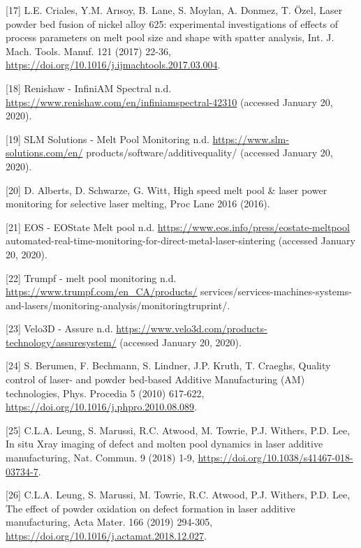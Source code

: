 \documentclass[10pt]{article}
\begin{document}
[17] L.E. Criales, Y.M. Arısoy, B. Lane, S. Moylan, A. Donmez, T. Özel, Laser powder bed fusion of nickel alloy 625: experimental investigations of effects of process parameters on melt pool size and shape with spatter analysis, Int. J. Mach. Tools. Manuf. 121 (2017) 22-36, \href{https://doi.org/10.1016/j.ijmachtools.2017.03.004}{https://doi.org/10.1016/j.ijmachtools.2017.03.004}.

[18] Renishaw - InfiniAM Spectral n.d. \href{https://www.renishaw.com/en/infiniamspectral-42310}{https://www.renishaw.com/en/infiniamspectral-42310} (accessed January 20, 2020).

[19] SLM Solutions - Melt Pool Monitoring n.d. \href{https://www.slm-solutions.com/en/}{https://www.slm-solutions.com/en/} products/software/additivequality/ (accessed January 20, 2020).

[20] D. Alberts, D. Schwarze, G. Witt, High speed melt pool \& laser power monitoring for selective laser melting, Proc Lane 2016 (2016).

[21] EOS - EOState Melt pool n.d. \href{https://www.eos.info/press/eostate-meltpool}{https://www.eos.info/press/eostate-meltpool} automated-real-time-monitoring-for-direct-metal-laser-sintering (accessed January 20, 2020).

[22] Trumpf - melt pool monitoring n.d. \href{https://www.trumpf.com/en_CA/products/}{https://www.trumpf.com/en\_CA/products/} services/services-machines-systems-and-lasers/monitoring-analysis/monitoringtruprint/.

[23] Velo3D - Assure n.d. \href{https://www.velo3d.com/products-technology/assuresystem/}{https://www.velo3d.com/products-technology/assuresystem/} (accessed January 20, 2020).

[24] S. Berumen, F. Bechmann, S. Lindner, J.P. Kruth, T. Craeghs, Quality control of laser- and powder bed-based Additive Manufacturing (AM) technologies, Phys. Procedia 5 (2010) 617-622, \href{https://doi.org/10.1016/j.phpro.2010.08.089}{https://doi.org/10.1016/j.phpro.2010.08.089}.

[25] C.L.A. Leung, S. Marussi, R.C. Atwood, M. Towrie, P.J. Withers, P.D. Lee, In situ Xray imaging of defect and molten pool dynamics in laser additive manufacturing, Nat. Commun. 9 (2018) 1-9, \href{https://doi.org/10.1038/s41467-018-03734-7}{https://doi.org/10.1038/s41467-018-03734-7}.

[26] C.L.A. Leung, S. Marussi, M. Towrie, R.C. Atwood, P.J. Withers, P.D. Lee, The effect of powder oxidation on defect formation in laser additive manufacturing, Acta Mater. 166 (2019) 294-305, \href{https://doi.org/10.1016/j.actamat.2018.12.027}{https://doi.org/10.1016/j.actamat.2018.12.027}.
\end{document}

